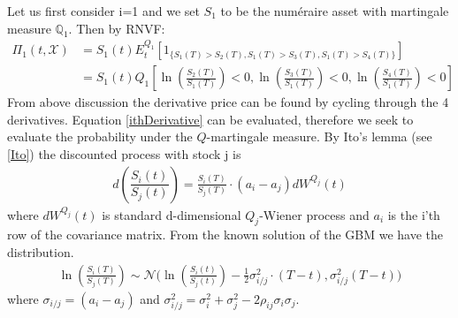 Let us first consider i=1 and we set $S_1$ to be the numéraire asset with martingale measure $\mathbb{Q}_1$. Then by RNVF:
\begin{equation}\label{ithDerivative}
\begin{split}
\Pi_1(t, \mathcal{X})&=S_1(t)E_t^{Q_1}[1_{\{S_1(T)>S_2(T), S_1(T)>S_3(T), S_1(T)>S_4(T)\}}]\\
&=S_1(t) Q_1[\ln(\frac{S_2(T)}{S_1(T)})<0, \ln(\frac{S_3(T)}{S_1(T)})<0, \ln(\frac{S_4(T)}{S_1(T)})<0]
\end{split}
\end{equation}
From above discussion the derivative price can be found by cycling through the 4 derivatives. Equation \eqref{ithDerivative} can be evaluated, therefore we seek to evaluate the probability under the $Q$-martingale measure. By Ito's lemma (see \ref{Ito}) the discounted process with stock j is
\begin{align*}
d(\dfrac{S_i(t)}{S_j(t)})=\frac{S_i(T)}{S_j(T)} \cdot (a_i-a_j)dW^{Q_j}(t) 
\end{align*}
where $dW^{Q_j}(t)$ is standard d-dimensional $Q_j$-Wiener process and $a_i$ is the i'th row of the covariance matrix. From the known solution of the GBM we have the distribution.
\begin{align*}
\ln(\frac{S_i(T)}{S_j(T)})\sim \mathcal{N}\bigg(\ln(\frac{S_i(t)}{S_j(t)}) - \frac{1}{2}\sigma_{i/j}^2 \cdot (T-t), \sigma_{i/j}^2 (T-t)\bigg)
\end{align*}
where $\sigma_{i/j}=(a_i-a_j)$ and $\sigma_{i/j}^2=\sigma_i^2+\sigma_j^2-2\rho_{ij}\sigma_i \sigma_j$.\\


